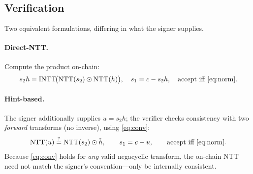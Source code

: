 \documentclass[11pt]{article}
\newcommand{\NTT}{\mathrm{NTT}}
\newcommand{\INTT}{\mathrm{INTT}}
\begin{document}
\subsection{Verification}
Two equivalent formulations, differing in what the signer supplies.

\paragraph{Direct-NTT.} Compute the product on-chain:
\begin{equation}
  s_2 h = \INTT\!\bigl(\NTT(s_2)\odot\NTT(h)\bigr),\quad
  s_1 = c - s_2 h,\quad \text{accept iff \eqref{eq:norm}} .
\end{equation}

\paragraph{Hint-based.} The signer additionally supplies $u=s_2h$; the verifier checks
consistency with two \emph{forward} transforms (no inverse), using \eqref{eq:conv}:
\begin{equation}
  \NTT(u) \overset{?}{=} \NTT(s_2)\odot \hat h,\qquad s_1 = c - u,\qquad \text{accept iff \eqref{eq:norm}} .
  \label{eq:hint}
\end{equation}
Because \eqref{eq:conv} holds for \emph{any} valid negacyclic transform, the on-chain NTT need
not match the signer's convention---only be internally consistent.

\end{document}
